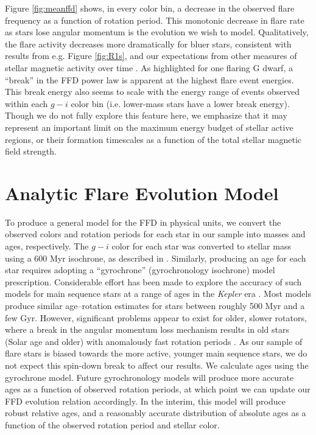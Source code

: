 \documentclass[preprint2]{aastex62}
\newcommand{\Kepler}{\textsl{Kepler}\xspace}
\begin{document}
Figure \ref{fig:meanffd} shows, in every color bin, a decrease in the observed flare frequency as a function of rotation period. This monotonic decrease in flare rate as stars lose angular momentum is the evolution we wish to model. Qualitatively, the flare activity decreases more dramatically for bluer stars, consistent with results from e.g. Figure \ref{fig:R1s}, and our expectations from other measures of stellar magnetic activity over time \citep[e.g.][]{shkolnik2014,nunez2017}. As \citet{davenport2016} highlighted for one flaring G dwarf, a ``break'' in the FFD power law is apparent at the highest flare event energies. This break energy also seems to scale with the energy range of events observed within each $g-i$ color bin (i.e. lower-mass stars have a lower break energy). Though we do not fully explore this feature here, we emphasize that it may represent an important limit on the maximum energy budget of stellar active regions, or their formation timescales as a function of the total stellar magnetic field strength.


\section{Analytic Flare Evolution Model}
\label{sec:ffdmodel}

To produce a general model for the FFD in physical units, we convert the observed colors and rotation periods for each star in our sample into masses and ages, respectively. The $g-i$ color for each star was converted to stellar mass using a 600 Myr isochrone, as described in \citet{davenport2016}. Similarly, producing an age for each star requires adopting a ``gyrochrone'' (gyrochronology isochrone) model prescription. Considerable effort has been made to explore the accuracy of such models for main sequence stars at a range of ages in the \Kepler era \citep[e.g.][]{mms+11,angus2015,douglas2016}. Most models produce similar age--rotation estimates for stars between roughly 500 Myr and a few Gyr. However, significant problems appear to exist for older, slower rotators, where a break in the angular momentum loss mechanism results in old stars (Solar age and older) with anomalously fast rotation periods \citep{van-saders2016}. As our sample of flare stars is biased towards the more active, younger main sequence stars, we do not expect this spin-down break to affect our results. We calculate ages using the \citet{mamajek2008} gyrochrone model. Future gyrochronology models will produce more accurate ages as a function of observed rotation periods, at which point we can update our FFD evolution relation accordingly. In the interim, this model will produce robust relative ages, and a reasonably accurate distribution of absolute ages as a function of the observed rotation period and stellar color.
\end{document}
